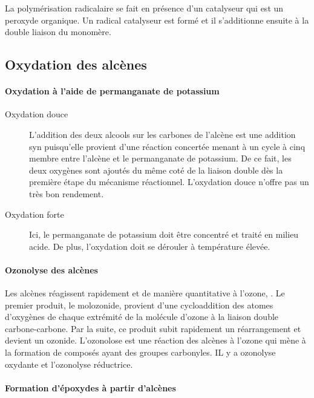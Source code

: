 La polymérisation radicalaire se fait en présence d'un catalyseur qui est un peroxyde organique.
Un radical catalyseur est formé et il s'additionne ensuite à la double liaison du monomère.

\subsection{Oxydation des alcènes}


\paragraph{Oxydation à l'aide de permanganate de potassium}

\begin{description}
  \item[Oxydation douce]

    L'addition des deux alcools sur les carbones de l'alcène est une addition syn puisqu'elle provient d'une réaction concertée menant à un cycle à cinq membre entre l'alcène et le permanganate de potassium.
    De ce fait, les deux oxygènes sont ajoutés du même coté de la liaison double dès la première étape du mécanisme réactionnel.
    L'oxydation douce n'offre pas un très bon rendement.
  \item[Oxydation forte]

    Ici, le permanganate de potassium doit être concentré et traité en milieu acide.
    De plus, l'oxydation doit se dérouler à température élevée.

\end{description}

\paragraph{Ozonolyse des alcènes}

Les alcènes réagissent rapidement et de manière quantitative à l'ozone, .
Le premier produit, le molozonide, provient d'une cycloaddition des atomes d'oxygènes de chaque extrémité de la molécule d'ozone à la liaison double carbone-carbone.
Par la suite, ce produit subit rapidement un réarrangement et devient un ozonide.
L'ozonolose est une réaction des alcènes à l'ozone qui mène à la formation de composés ayant des groupes carbonyles.
IL y a ozonolyse oxydante et l'ozonolyse réductrice.


\paragraph{Formation d'époxydes à partir d'alcènes}

